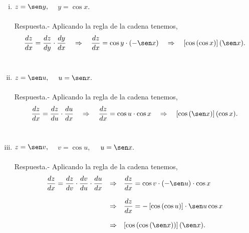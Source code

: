 \begin{enumerate}[\bfseries 1.]
\begin{enumerate}[(i)]
	     \item $z=\sen y,$ $\quad y=\cos x.$\\\\
		 Respuesta.-\; Aplicando la regla de la cadena tenemos,
		 $$\dfrac{dz}{dx}=\dfrac{dz}{dy}\cdot \dfrac{dy}{dx}\quad \Rightarrow \quad \dfrac{dz}{dx}=\cos y \cdot (-\sen x)\quad \Rightarrow \quad \left[\cos\left(\cos x\right)\right](\sen x).$$\\
	     
	     \item $z=\sen u,$ $\quad u=\sen x.$\\\\
		 Respuesta.-\; Aplicando la regla de la cadena tenemos,
		 $$\dfrac{dz}{dx}=\dfrac{dz}{du}\cdot \dfrac{du}{dx}\quad \Rightarrow \quad \dfrac{dz}{dx}=\cos u \cdot \cos x\quad \Rightarrow \quad \left[\cos\left(\sen x\right)\right](\cos x).$$\\

	     \item $z=\sen v,$ $\quad v=\cos u,$ $\quad u=\sen x.$\\\\
		 Respuesta.-\; Aplicando la regla de la cadena tenemos,
		 $$\begin{array}{rcl}
		     \dfrac{dz}{dx}=\dfrac{dz}{dv}\cdot \dfrac{dv}{du}\cdot \dfrac{du}{dx}&\Rightarrow&\dfrac{dz}{dx}=\cos v \cdot (-\sen u) \cdot \cos x\\\\
		     &\Rightarrow& \dfrac{dz}{dx}=-\left[\cos \left(\cos u\right)\right]\cdot \sen u \cos x \\\\
		     &\Rightarrow& \left[\cos\left(\cos\left(\sen x\right)\right)\right](\sen x).\\
		 \end{array}$$\\

	 \end{enumerate}

\end{enumerate}
